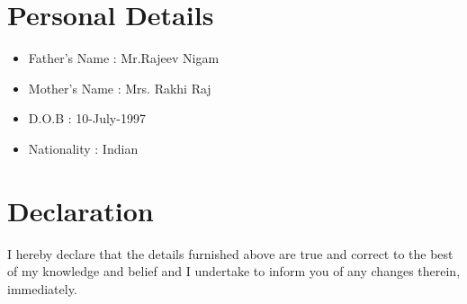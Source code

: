 \documentclass[]{article}
\begin{document}
\section{Personal Details}
\begin{itemize}
\item Father's Name : Mr.Rajeev Nigam
\item Mother's Name : Mrs. Rakhi Raj
\item D.O.B : 10-July-1997
\item Nationality : Indian
\end{itemize}

\section{Declaration}
\begin{flushleft}
I hereby declare that the details furnished above are true and correct to the best of my knowledge and belief and I undertake to inform you of any changes therein, immediately.

\end{flushleft}
\end{document}
